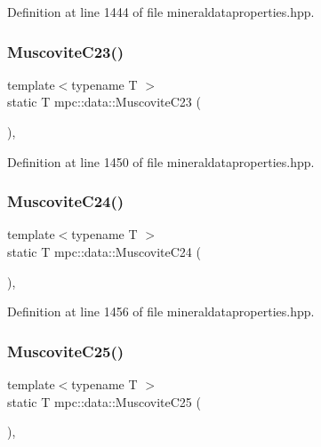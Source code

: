 Definition at line 1444 of file mineraldataproperties.\+hpp.

\mbox{\label{namespacempc_1_1data_a61cbb2e041d1f7e9b242883219055806}} 
\subsubsection{\texorpdfstring{Muscovite\+C23()}{MuscoviteC23()}}
{\footnotesize\ttfamily template$<$typename T $>$ \\
static T mpc\+::data\+::\+Muscovite\+C23 (\begin{DoxyParamCaption}{ }\end{DoxyParamCaption})\hspace{0.3cm}{\ttfamily [inline]}, {\ttfamily [static]}}



Definition at line 1450 of file mineraldataproperties.\+hpp.

\mbox{\label{namespacempc_1_1data_ac5870f3f8c129765629b6fec66fa9c8d}} 
\subsubsection{\texorpdfstring{Muscovite\+C24()}{MuscoviteC24()}}
{\footnotesize\ttfamily template$<$typename T $>$ \\
static T mpc\+::data\+::\+Muscovite\+C24 (\begin{DoxyParamCaption}{ }\end{DoxyParamCaption})\hspace{0.3cm}{\ttfamily [inline]}, {\ttfamily [static]}}



Definition at line 1456 of file mineraldataproperties.\+hpp.

\mbox{\label{namespacempc_1_1data_a09691a47da16c0fe7b3b292c0fc8394f}} 
\subsubsection{\texorpdfstring{Muscovite\+C25()}{MuscoviteC25()}}
{\footnotesize\ttfamily template$<$typename T $>$ \\
static T mpc\+::data\+::\+Muscovite\+C25 (\begin{DoxyParamCaption}{ }\end{DoxyParamCaption})\hspace{0.3cm}{\ttfamily [inline]}, {\ttfamily [static]}}



